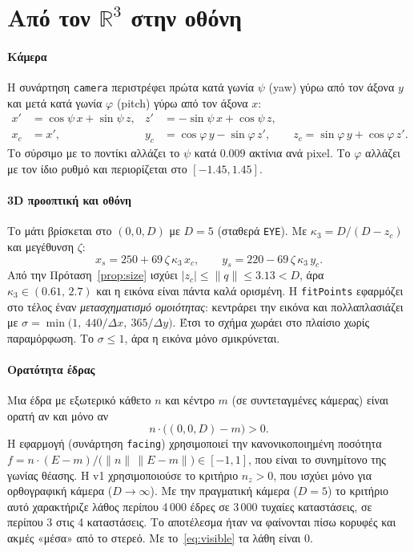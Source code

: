 \documentclass[10pt,a4paper]{article}
\theoremstyle{plain}
\theoremstyle{definition}
\newcommand{\R}{\mathbb{R}}
\newcommand{\code}[1]{\texttt{#1}}
\newcommand{\eng}[1]{\textenglish{#1}}
\begin{document}
\section{Από τον \texorpdfstring{$\R^3$}{R3} στην οθόνη}\label{sec:camera}
\paragraph{Κάμερα} Η συνάρτηση \code{camera} περιστρέφει πρώτα κατά γωνία $\psi$ (\eng{yaw}) γύρω από τον άξονα $y$ και μετά κατά γωνία $\varphi$ (\eng{pitch}) γύρω από τον άξονα $x$:
\[
\begin{aligned}
x' &= \cos\psi\,x+\sin\psi\,z, & z' &= -\sin\psi\,x+\cos\psi\,z,\\
x_c&=x', & y_c&=\cos\varphi\,y-\sin\varphi\,z',\qquad z_c=\sin\varphi\,y+\cos\varphi\,z'.
\end{aligned}
\]
Το σύρσιμο με το ποντίκι αλλάζει το $\psi$ κατά $0.009$ ακτίνια ανά pixel. Το $\varphi$ αλλάζει με τον ίδιο ρυθμό και περιορίζεται στο $[-1.45,1.45]$.

\paragraph{3D προοπτική και οθόνη} Το μάτι βρίσκεται στο $(0,0,D)$ με $D=5$ (σταθερά \code{EYE}). Με $\kappa_3=D/(D-z_c)$ και μεγέθυνση $\zeta$:
\[
x_s=250+69\,\zeta\,\kappa_3\,x_c,\qquad y_s=220-69\,\zeta\,\kappa_3\,y_c .
\]
Από την Πρόταση~\ref{prop:size} ισχύει $|z_c|\le\|q\|\le3.13<D$, άρα $\kappa_3\in(0.61,\,2.7)$ και η εικόνα είναι πάντα καλά ορισμένη. Η \code{fitPoints} εφαρμόζει στο τέλος έναν \emph{μετασχηματισμό ομοιότητας}: κεντράρει την εικόνα και πολλαπλασιάζει με $\sigma=\min\bigl(1,\ 440/\Delta x,\ 365/\Delta y\bigr)$. Έτσι το σχήμα χωράει στο πλαίσιο χωρίς παραμόρφωση. Το $\sigma\le1$, άρα η εικόνα μόνο σμικρύνεται.

\paragraph{Ορατότητα έδρας} Μια έδρα με εξωτερικό κάθετο $n$ και κέντρο $m$ (σε συντεταγμένες κάμερας) είναι ορατή αν και μόνο αν
\begin{equation}\label{eq:visible}
n\cdot\bigl((0,0,D)-m\bigr)>0 .
\end{equation}
Η εφαρμογή (συνάρτηση \code{facing}) χρησιμοποιεί την κανονικοποιημένη ποσότητα $f=n\cdot(E-m)/\bigl(\|n\|\,\|E-m\|\bigr)\in[-1,1]$, που είναι το συνημίτονο της γωνίας θέασης. Η v1 χρησιμοποιούσε το κριτήριο $n_z>0$, που ισχύει μόνο για ορθογραφική κάμερα ($D\to\infty$). Με την πραγματική κάμερα ($D=5$) το κριτήριο αυτό χαρακτήριζε λάθος περίπου 4\,000 έδρες σε 3\,000 τυχαίες καταστάσεις, σε περίπου 3 στις 4 καταστάσεις. Το αποτέλεσμα ήταν να φαίνονται πίσω κορυφές και ακμές «μέσα» από το στερεό. Με το~\eqref{eq:visible} τα λάθη είναι 0.
\end{document}
